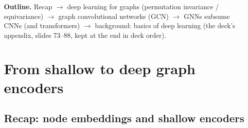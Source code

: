 \label{ch:lec03}

\providecommand{\lecIIIsixgraph}[8]{%
  \node[#1, lec03cA] (#2a) at (0.9,1.25) {#3};
  \node[#1, lec03cB] (#2b) at (2.5,1.9)  {#4};
  \node[#1, lec03cC] (#2c) at (2.9,1.0)  {#5};
  \node[#1, lec03cD] (#2d) at (0.0,0.0)  {#6};
  \node[#1, lec03cE] (#2e) at (1.9,0.1)  {#7};
  \node[#1, lec03cF] (#2f) at (3.6,0.35) {#8};
  \draw[edge] (#2a)--(#2b) (#2a)--(#2c) (#2a)--(#2d) (#2b)--(#2c)
              (#2c)--(#2e) (#2c)--(#2f) (#2e)--(#2f);
}

\textbf{Outline.} Recap $\to$ deep learning for graphs (permutation
invariance / equivariance) $\to$ graph convolutional networks (GCN) $\to$ GNNs
subsume CNNs (and transformers) $\to$ background: basics of deep learning (the
deck's appendix, slides 73--88, kept at the end in deck order).

\section{From shallow to deep graph encoders}\label{sec:lec03-intro}

\subsection{Recap: node embeddings and shallow encoders}\label{sec:lec03-recap}

